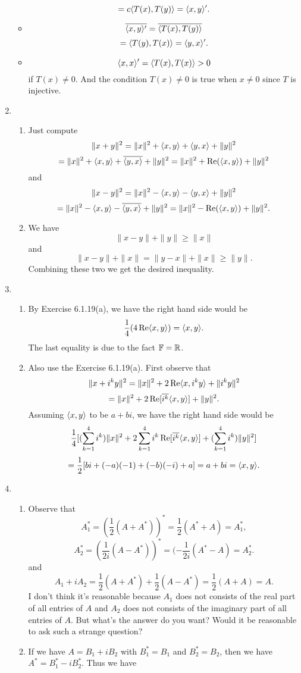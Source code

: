 \begin{enumerate}
\begin{itemize}
\[=c\langle T(x),T(y)\rangle =\langle x,y\rangle'.\]
\item \[\overline{\langle x,y\rangle'}=\overline{\langle T(x),T(y)\rangle}\]
\[=\langle T(y),T(x)\rangle =\langle y,x\rangle'.\]
\item \[\langle x,x\rangle'=\langle T(x),T(x)\rangle>0\]
if $T(x)\neq 0$. And the condition $T(x)\neq 0$ is true when $x\neq 0$ since $T$ is injective.
\end{itemize}
\item \begin{enumerate}
\item Just compute 
\[\|x+y\|^2=\|x\|^2+\langle x,y\rangle +\langle y,x\rangle +\|y\|^2\]
\[=\|x\|^2+\langle x,y\rangle +\overline{\langle y,x\rangle }+\|y\|^2=\|x\|^2+\operatorname{Re}(\langle x,y\rangle )+\|y\|^2\]
and 
\[\|x-y\|^2=\|x\|^2-\langle x,y\rangle -\langle y,x\rangle +\|y\|^2\]
\[=\|x\|^2-\langle x,y\rangle -\overline{\langle y,x\rangle }+\|y\|^2=\|x\|^2-\operatorname{Re}(\langle x,y\rangle )+\|y\|^2.\]
\item We have 
\[\|x-y\|+\|y\|\geq \|x\|\]
and 
\[\|x-y\|+\|x\|=\|y-x\|+\|x\|\geq \|y\|.\]
Combining these two we get the desired inequality.
\end{enumerate}
\item \begin{enumerate}
\item By Exercise 6.1.19(a), we have the right hand side would be 
\[\frac{1}{4}(4\operatorname{Re}\langle x,y\rangle)=\langle x,y\rangle.\]
The last equality is due to the fact $\mathbb{F}=\mathbb{R}$.
\item Also use the Exercise 6.1.19(a). First observe that 
\[\|x+i^ky\|^2=\|x\|^2+2\operatorname{Re}\langle x,i^ky\rangle +\|i^ky\|^2\]
\[=\|x\|^2+2\operatorname{Re}[\overline{i^k}\langle x,y\rangle ]+\|y\|^2.\]
Assuming $\langle x,y\rangle$ to be $a+bi$, we have the right hand side would be
\[\frac{1}{4}[(\sum_{k=1}^4{i^k})\|x\|^2+2\sum_{k=1}^4{i^k\operatorname{Re}[\overline{i^k}\langle x,y\rangle ]}+(\sum_{k=1}^4{i^k})\|y\|^2]\]
\[=\frac{1}{2}[bi+(-a)(-1)+(-b)(-i)+a]=a+bi=\langle x,y\rangle.\]
\end{enumerate}
\item \begin{enumerate}
\item Observe that 
\[A_1^*=(\frac{1}{2}(A+A^*))^*=\frac{1}{2}(A^*+A)=A_1^*,\]
\[A_2^*=(\frac{1}{2i}(A-A^*))^*=(-\frac{1}{2i}(A^*-A)=A_2^*.\]
and 
\[A_1+iA_2=\frac{1}{2}(A+A^*)+\frac{1}{2}(A-A^*)=\frac{1}{2}(A+A)=A.\]
I don't think it's reasonable because $A_1$ does not consists of the real part of all entries of $A$ and $A_2$ does not consists of the imaginary part of all entries of $A$. But what's the answer do you want? Would it be reasonable to ask such a strange question?
\item If we have $A=B_1+iB_2$ with $B_1^*=B_1$ and $B_2^*=B_2$, then we have $A^*=B_1^*-iB_2^*$. Thus we have 

\end{enumerate}
\end{enumerate}
